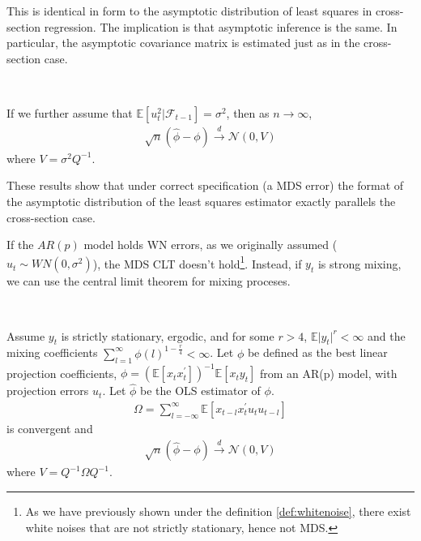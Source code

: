 This is identical in form to the asymptotic distribution of least squares in cross-section regression.
The implication is that asymptotic inference is the same. In particular, the asymptotic covariance matrix
is estimated just as in the cross-section case.
\begin{theorem}\label{thm:mds-ar-asymptotic-normality-2}
    \
    
    If we further assume that $\mathbb{E}[u_t^2 | \mathcal{F}_{t-1}] = \sigma^2$, then as $n \to \infty$,
    \begin{gather*}
        \sqrt{n}\left( \hat{\phi} - \phi \right) \overset{d}{\rightarrow} \mathcal{N}(0, V)
    \end{gather*}
    where $V = \sigma^2 Q^{-1}.$   
\end{theorem}
These results show that under correct specification (a MDS error) the format of the asymptotic distribution of the least squares estimator exactly parallels the cross-section case.

If the $AR(p)$ model holds WN errors, as we originally assumed ($u_t \sim WN(0, \sigma^2)$), the MDS CLT doesn't hold\footnote{As we have previously shown under the definition \ref{def:whitenoise}, there exist white noises that are not strictly stationary, hence not MDS.}.
Instead, if $y_t$ is strong mixing, we can use the central limit theorem for mixing proceses.
\begin{theorem}\label{thm:mixing-ar-asymptotic-normality}
    \
    
    Assume $y_t$ is strictly stationary, ergodic, and for some $r>4$, $\mathbb{E}\vert y_t \vert^r < \infty$
    and the mixing coefficients $\sum_{l=1}^{\infty} \phi(l)^{1-\frac{r}{4}} < \infty$.
    Let $\phi $ be defined as the best linear projection coefficients, $\phi = \left(\mathbb{E}[x_t x_t^{\prime} ]\right)^{-1} \mathbb{E}[x_t y_t]$
    from an AR(p) model, with projection errors $u_t$. Let $\hat{\phi}$ be the OLS estimator of $\phi$.
    \begin{gather*}
        \Omega = \sum_{l=-\infty}^{\infty} \mathbb{E} \left[ x_{t-l} x_t^{\prime} u_t u_{t-l} \right]
    \end{gather*}
    is convergent and
    \begin{gather*}
        \sqrt{n} (\hat{\phi} - \phi) \overset{d}{\rightarrow} \mathcal{N}(0, V)
    \end{gather*}
    where $V = Q^{-1} \Omega Q^{-1}.$
\end{theorem}

